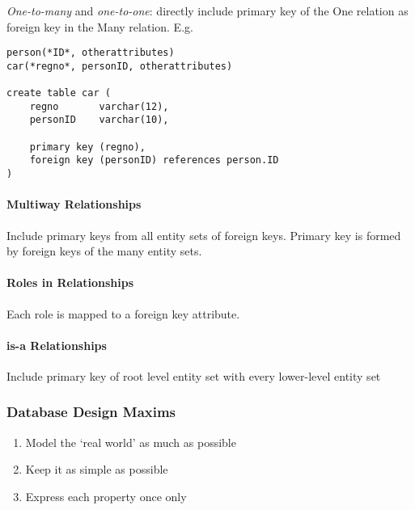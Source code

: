 \documentclass[twocolumn,english]{article}
\begin{document}
\noindent \emph{One-to-many} and \emph{one-to-one}: directly include
primary key of the One relation as foreign key in the Many relation.
E.g.

\begin{lstlisting}
person(*ID*, otherattributes)
car(*regno*, personID, otherattributes)

create table car (
	regno       varchar(12),
	personID    varchar(10),

	primary key (regno),
	foreign key (personID) references person.ID
)
\end{lstlisting}



\paragraph{Multiway Relationships}

Include primary keys from all entity sets of foreign keys. Primary
key is formed by foreign keys of the many entity sets.


\paragraph{Roles in Relationships}

Each role is mapped to a foreign key attribute.


\paragraph{is-a Relationships}

Include primary key of root level entity set with every lower-level
entity set


\subsubsection{Database Design Maxims}
\begin{enumerate}
\item Model the `real world' as much as possible
\item Keep it as simple as possible
\item Express each property once only
\end{enumerate}
\end{document}
